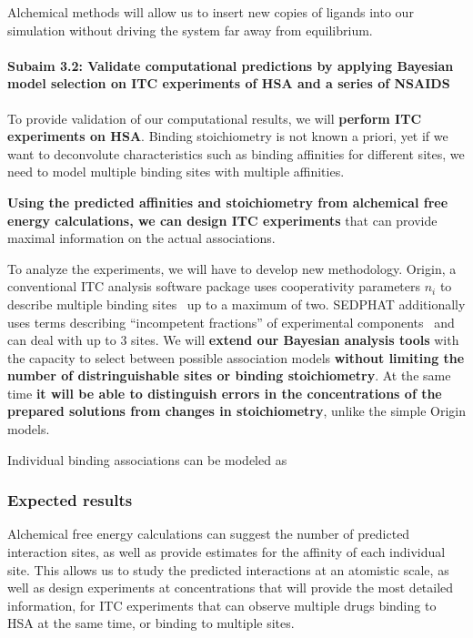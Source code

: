 \documentclass[10pt,final]{article}
\newcommand{\subsubsubsection}[1]{\paragraph*{#1}}
\begin{document}
Alchemical methods will allow us to insert new copies of ligands into our simulation without driving the system far away from equilibrium. 


\subsubsubsection{Subaim 3.2: Validate computational predictions by applying Bayesian model selection on ITC  experiments of HSA and a series of NSAIDS}
To provide validation of our computational results, we will \textbf{perform ITC experiments on HSA}. Binding stoichiometry is not known a priori, yet if we want to deconvolute characteristics such as binding affinities for different sites, we need to model multiple binding sites with multiple affinities.

\textbf{Using the predicted affinities and stoichiometry from alchemical free energy calculations, we can design ITC experiments} that can provide maximal information on the actual associations. 

To analyze the experiments, we will have to develop new methodology. 
Origin, a conventional ITC analysis software package uses cooperativity parameters $n_i$ to describe multiple binding sites~\cite{MicroCal2004a} up to a maximum of two. SEDPHAT additionally uses terms describing ``incompetent fractions'' of experimental components~\cite{Houtman2007a,Zhao2015b} and can deal with up to 3 sites.
We will \textbf{extend our Bayesian analysis tools} with the capacity to select between possible association models \textbf{without limiting the number of distringuishable sites or binding stoichiometry}. At the same time \textbf{it will be able to distinguish errors in the concentrations of the prepared solutions from changes in stoichiometry}, unlike the simple Origin models. 


Individual binding associations can be modeled as

\subsubsection*{Expected results}
Alchemical free energy calculations can suggest the number of predicted interaction sites, as well as provide estimates for the affinity of each individual site.
This allows us to study the predicted interactions at an atomistic scale, as well as design experiments at concentrations that will provide the most detailed information, for ITC experiments that can observe multiple drugs binding to HSA at the same time, or binding to multiple sites.
\end{document}
